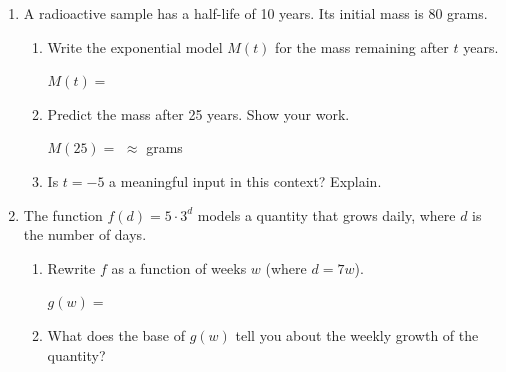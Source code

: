 \documentclass[10pt]{article}
\begin{document}
\begin{enumerate}[itemsep=18pt]
\item A radioactive sample has a half-life of 10 years. Its initial mass is 80 grams.

      \begin{enumerate}[label=(\alph*), itemsep=8pt]
        \item Write the exponential model $M(t)$ for the mass remaining after $t$ years.

              \vspace{0.06in}
              $M(t) = $ \smash{\gradedblank[id=hw3a, type=short, points=1, answer={80 \cdot (0.5)^{t/10}}]{7cm}{13pt}}

        \item Predict the mass after 25 years. Show your work.

              \vspace{0.06in}
              $M(25) = $  $\approx$ \smash{\gradedblank[id=hw3b, type=short, check=numeric, tolerance=0.05, points=2, answer={14.1}]{2cm}{13pt}} grams

        \item Is $t = -5$ a meaningful input in this context? Explain.

              \rubricbox[0.06in]{\gradedblank[id=hw3c, type=rubric, points=2,
  display={No: $t$ is the time elapsed since the start; a negative time has no meaning here.}]{\linewidth}{17pt}}
      \end{enumerate}

\item The function $f(d) = 5 \cdot 3^d$ models a quantity that grows daily, where $d$ is the
      number of days.

      \begin{enumerate}[label=(\alph*), itemsep=8pt]
        \item Rewrite $f$ as a function of weeks $w$ (where $d = 7w$).

              \vspace{0.06in}
              $g(w) = $ \smash{\gradedblank[id=hw4a, type=short, points=2, answer={5 \cdot 2187^w}]{8cm}{13pt}} \quad {}

        \item What does the base of $g(w)$ tell you about the weekly growth of the quantity?

              \rubricbox[0.04in]{\gradedblank[id=hw4b, type=rubric, points=1,
  display={The quantity multiplies by 2187 every week.}]{\linewidth}{15.5pt}}


\end{enumerate}
\end{enumerate}
\end{document}
